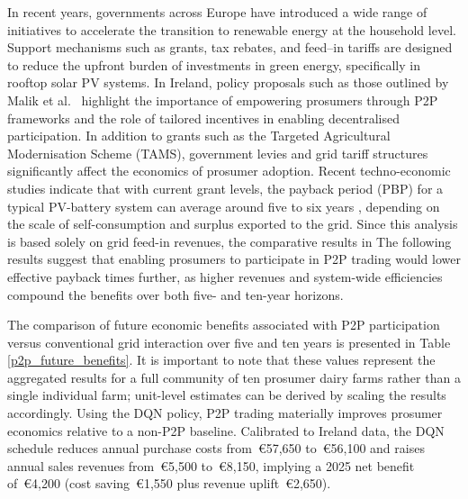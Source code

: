 \documentclass[preprint,12pt]{elsarticle}
\begin{document}
In recent years, governments across Europe have introduced a wide range of initiatives to accelerate the transition to renewable energy at the household level. Support mechanisms such as grants, tax rebates, and feed--in tariffs are designed to reduce the upfront burden of investments in green energy, specifically in rooftop solar PV systems. In Ireland, policy proposals such as those outlined by Malik et al.~\cite{malik2025towards} highlight the importance of empowering prosumers through P2P frameworks and the role of tailored incentives in enabling decentralised participation. In addition to grants such as the Targeted Agricultural Modernisation Scheme (TAMS), government levies and grid tariff structures significantly affect the economics of prosumer adoption. Recent techno-economic studies indicate that with current grant levels, the payback period (PBP) for a typical PV-battery system can average around five to six years \cite{bakht2025techno}, depending on the scale of self-consumption and surplus exported to the grid. Since this analysis is based solely on grid feed-in revenues, the comparative results in The following results suggest that enabling prosumers to participate in P2P trading would lower effective payback times further, as higher revenues and system-wide efficiencies compound the benefits over both five- and ten-year horizons.

The comparison of future economic benefits associated with P2P participation versus conventional grid interaction over five and ten years is presented in Table \ref{p2p_future_benefits}. It is important to note that these values represent the aggregated results for a full community of ten prosumer dairy farms rather than a single individual farm; unit-level estimates can be derived by scaling the results accordingly. Using the DQN policy, P2P trading materially improves prosumer economics relative to a non-P2P baseline. Calibrated to Ireland data, the DQN schedule reduces annual purchase costs from~\euro57{,}650 to~\euro56{,}100 and raises annual sales revenues from~\euro5{,}500 to~\euro8{,}150, implying a 2025 net benefit of~\euro4{,}200 (cost saving~\euro1{,}550 plus revenue uplift~\euro2{,}650).
\end{document}
